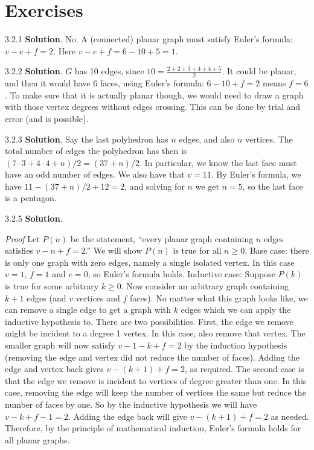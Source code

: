 \documentclass[11pt,]{book}
\makeatletter
\theoremstyle{ptxplainnotitle}
\theoremstyle{ptxplaintitle}
\renewcommand*{\proofname}{Proof}
\renewenvironment{proof}[1][\proofname]{\par
  \pushQED{\qed}%
  \normalfont \topsep6\p@\@plus6\p@\relax
  \trivlist
  \item\relax
    {\itshape
    #1\@addpunct{.}}\hspace\labelsep\ignorespaces
}{%
  \popQED\endtrivlist\@endpefalse
}
\theoremstyle{ptxdefinitionnotitle}
\theoremstyle{ptxdefinitiontitle}
\theoremstyle{ptxdefinitionnotitle}
\theoremstyle{ptxdefinitiontitle}
\theoremstyle{ptxdefinitionnotitle}
\theoremstyle{ptxdefinitiontitle}
\theoremstyle{ptxdefinitiontitlenonumber}
\theoremstyle{ptxdefinitiontitlenonumber}
\numberwithin{equation}{chapter}
\makeatother
\begin{document}
\section*{Exercises}
\begin{divisionexercise}{3.2.1}
\textbf{Solution}.\quad%
\hypertarget{p-2857}{}%
No. A (connected) planar graph must satisfy Euler's formula: \(v - e + f = 2\). Here \(v - e + f = 6 - 10 + 5 = 1\).%
\end{divisionexercise}%
\begin{divisionexercise}{3.2.2}
\textbf{Solution}.\quad%
\hypertarget{p-2859}{}%
\(G\) has 10 edges, since \(10 = \frac{2+2+3+4+4+5}{2}\). It could be planar, and then it would have 6 faces, using Euler's formula: \(6-10+f = 2\) means \(f = 6\).  To make sure that it is actually planar though, we would need to draw a graph with those vertex degrees without edges crossing.  This can be done by trial and error (and is possible).%
\end{divisionexercise}%
\begin{divisionexercise}{3.2.3}
\textbf{Solution}.\quad%
\hypertarget{p-2861}{}%
Say the last polyhedron has \(n\) edges, and also \(n\) vertices. The total number of edges the polyhedron has then is \((7 \cdot 3 + 4 \cdot 4 + n)/2 = (37 + n)/2\). In particular, we know the last face must have an odd number of edges. We also have that \(v = 11 \).  By Euler's formula, we have \(11 - (37+n)/2 + 12 = 2\), and solving for \(n\) we get \(n = 5\), so the last face is a pentagon.%
\end{divisionexercise}%
\begin{divisionexercise}{3.2.5}
\textbf{Solution}.\quad%
\begin{proof}\hypertarget{proof-43}{}
\hypertarget{p-2867}{}%
Let \(P(n)\) be the statement, ``every planar graph containing \(n\) edges satisfies \(v - n + f = 2\).'' We will show \(P(n)\) is true for all \(n \ge 0\). Base case: there is only one graph with zero edges, namely a single isolated vertex. In this case \(v = 1\), \(f = 1\) and \(e = 0\), so Euler's formula holds. Inductive case: Suppose \(P(k)\) is true for some arbitrary \(k \ge 0\). Now consider an arbitrary graph containing \(k+1\) edges (and \(v\) vertices and \(f\) faces). No matter what this graph looks like, we can remove a single edge to get a graph with \(k\) edges which we can apply the inductive hypothesis to. There are two possibilities. First, the edge we remove might be incident to a degree 1 vertex. In this case, also remove that vertex. The smaller graph will now satisfy \(v-1 - k + f = 2\) by the induction hypothesis (removing the edge and vertex did not reduce the number of faces). Adding the edge and vertex back gives \(v - (k+1) + f = 2\), as required. The second case is that the edge we remove is incident to vertices of degree greater than one. In this case, removing the edge will keep the number of vertices the same but reduce the number of faces by one. So by the inductive hypothesis we will have \(v - k + f-1 = 2\). Adding the edge back will give \(v - (k+1) + f = 2\) as needed. Therefore, by the principle of mathematical induction, Euler's formula holds for all planar graphs.%
\end{proof}
\end{divisionexercise}%
\end{document}
